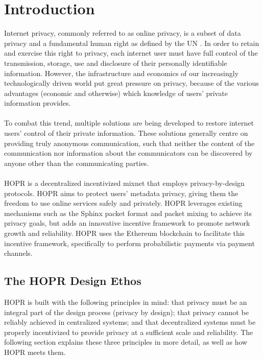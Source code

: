 \begin{abstract}

\end{abstract}

\section{Introduction}
\label{sec:introduction}

Internet privacy, commonly referred to as online privacy, is a subset of
data privacy and a fundamental human right as defined by the UN \cite{un2018}.
In order to retain and exercise this right to privacy, each internet user must have full control of the transmission, storage, use and disclosure of their
personally identifiable information. However, the infrastructure and economics of our increasingly technologically driven world put great pressure on privacy, because of the various advantages (economic and otherwise) which knowledge of users' private information provides. 
\\~\\To combat this trend, multiple solutions are being developed to restore internet users' control of their private information. These solutions generally centre on providing truly anonymous communication, such that neither the content of the communication nor information about the communicators can be discovered by anyone other than the communicating parties.
\\~\\HOPR is a decentralized incentivized mixnet that employs privacy-by-design protocols. HOPR aims to protect users' metadata privacy, giving them the
freedom to use online services safely and privately. HOPR leverages existing mechanisms such as the Sphinx packet format
\cite{sphinxpaper} and packet mixing to achieve its privacy goals, but adds an innovative incentive framework to promote network growth and reliability. HOPR uses the
Ethereum blockchain \cite{ethereum} to facilitate this incentive framework, specifically to perform probabilistic payments via payment channels. 


\subsection{The HOPR Design Ethos}
\label{sec:vision}

HOPR is built with the following principles in mind: that privacy must be an integral part of the design process (privacy by design); that privacy cannot be reliably achieved in centralized systems; and that decentralized systems must be properly incentivized to provide privacy at a sufficient scale and reliability. The following section explains these three principles in more detail, as well as how HOPR meets them.


